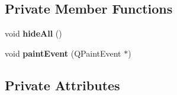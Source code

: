 \subsection*{Private Member Functions}
\begin{DoxyCompactItemize}
\item 
\hypertarget{classMainMenu_ad90c8ae6602ee2d4d54d60e1a5d221fa}{
void {\bfseries hideAll} ()}
\label{classMainMenu_ad90c8ae6602ee2d4d54d60e1a5d221fa}

\item 
\hypertarget{classMainMenu_a46a3c8cb379d15f746e41af4f3dc02a2}{
void {\bfseries paintEvent} (QPaintEvent $\ast$)}
\label{classMainMenu_a46a3c8cb379d15f746e41af4f3dc02a2}

\end{DoxyCompactItemize}
\subsection*{Private Attributes}

